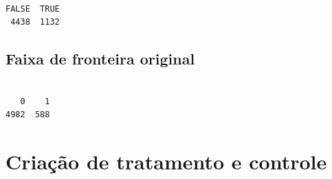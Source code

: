 \documentclass[
  letterpaper,
  DIV=11,
  numbers=noendperiod]{scrartcl}
\newenvironment{Shaded}{\begin{snugshade}}{\end{snugshade}}
\newcommand{\AttributeTok}[1]{\textcolor[rgb]{0.40,0.45,0.13}{#1}}
\newcommand{\CommentTok}[1]{\textcolor[rgb]{0.37,0.37,0.37}{#1}}
\newcommand{\DecValTok}[1]{\textcolor[rgb]{0.68,0.00,0.00}{#1}}
\newcommand{\FunctionTok}[1]{\textcolor[rgb]{0.28,0.35,0.67}{#1}}
\newcommand{\NormalTok}[1]{\textcolor[rgb]{0.00,0.23,0.31}{#1}}
\newcommand{\OtherTok}[1]{\textcolor[rgb]{0.00,0.23,0.31}{#1}}
\newcommand{\SpecialCharTok}[1]{\textcolor[rgb]{0.37,0.37,0.37}{#1}}
\begin{document}
\begin{verbatim}

FALSE  TRUE 
 4438  1132 
\end{verbatim}

\hypertarget{faixa-de-fronteira-original}{%
\subsection{Faixa de fronteira
original}\label{faixa-de-fronteira-original}}

\begin{Shaded}
\end{Shaded}

\begin{verbatim}

   0    1 
4982  588 
\end{verbatim}

\hypertarget{criauxe7uxe3o-de-tratamento-e-controle}{%
\section{Criação de tratamento e
controle}\label{criauxe7uxe3o-de-tratamento-e-controle}}
\end{document}
